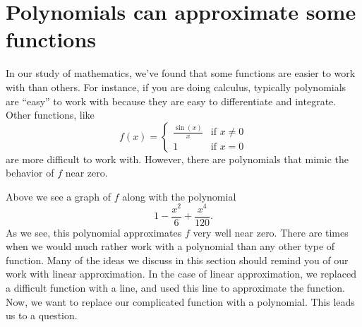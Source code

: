 \documentclass{ximera}
\begin{document}
 


\section{Polynomials can approximate some functions}

In our study of mathematics, we've found that some functions are
easier to work with than others. For instance, if you are doing
calculus, typically polynomials are ``easy'' to work with because they
are easy to differentiate and integrate. Other functions, like
\[
f(x) =
\begin{cases}
  \frac{\sin(x)}{x} &\text{if $x\ne 0$}\\
  1 &\text{if $x=0$}
\end{cases}
\]
are more difficult to work with. However, there are
polynomials that mimic the behavior of $f$ near zero.
\begin{image}
\end{image}
Above we see a graph of $f$ along with the polynomial
\[
1-\frac{x^2}{6}+\frac{x^4}{120}.
\]
As we see, this polynomial approximates $f$ very well near zero.  There are times 
when we would much rather work with a polynomial than any other type of function. 
Many of the ideas we discuss in this section should remind you of our work with 
linear approximation.  In the case of linear approximation, we replaced a difficult 
function with a line, and used this line to approximate the function.  Now, we want to 
replace our complicated function with a polynomial. This leads us to a question.
\end{document}
